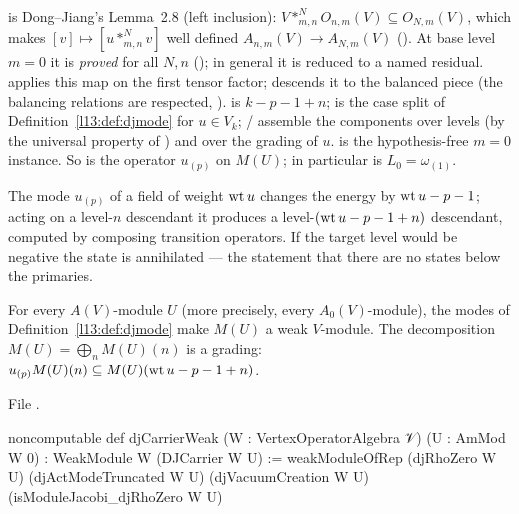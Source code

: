 \begin{dictionary}
 is Dong--Jiang's Lemma~2.8 (left inclusion): $V*^N_{m,n}O_{n,m}(V)\subseteq O_{N,m}(V)$, which makes
$[v]\mapsto[u*^N_{m,n}v]$ well defined $A_{n,m}(V)\to A_{N,m}(V)$ (). At base level $m = 0$ it is
\emph{proved} for all $N,n$ (); in general it is reduced to a named residual. 
applies this map on the first tensor factor;  descends it to the balanced piece (the balancing relations are
respected, ).  is $k-p-1+n$;  is the case split of
Definition~\ref{l13:def:djmode} for $u\in V_k$; / assemble the components over levels (by the
universal property of ) and over the grading of $u$.  is the hypothesis-free $m = 0$ instance. So
 is the operator $u_{(p)}$ on $M(U)$; in particular  is
$L_0 = \omega_{(1)}$.
\end{dictionary}

\begin{physics}
The mode $u_{(p)}$ of a field of weight $\operatorname{wt} u$ changes the energy by $\operatorname{wt} u-p-1$; acting on a level-$n$ descendant it produces a
level-$(\operatorname{wt} u-p-1+n)$ descendant, computed by composing transition operators. If the target level would be negative the state is
annihilated --- the statement that there are no states below the primaries.
\end{physics}

\begin{theorem}\label{l13:thm:djweak}
For every $A(V)$-module $U$ (more precisely, every $A_0(V)$-module), the modes of Definition~\ref{l13:def:djmode} make $M(U)$
a weak $V$-module. The decomposition $M(U) = \bigoplus_nM(U)(n)$ is a grading: $u_{(p)}M(U)(n)\subseteq M(U)(\operatorname{wt} u-p-1+n)$.
\end{theorem}
\noindent File .
\begin{leancode}
noncomputable def djCarrierWeak (W : VertexOperatorAlgebra 𝒱) (U : AmMod W 0) :
    WeakModule W (DJCarrier W U) :=
  weakModuleOfRep (djRhoZero W U) (djActModeTruncated W U) (djVacuumCreation W U)
    (isModuleJacobi_djRhoZero W U)
\end{leancode}

